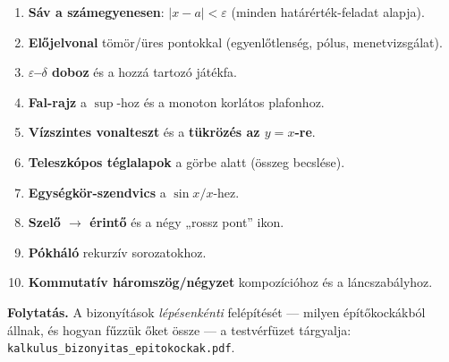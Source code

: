 \documentclass[11pt,a4paper]{article}
\newcommand{\lean}[1]{\texttt{\small #1}}
\newcommand{\eps}{\varepsilon}
\theoremstyle{definition}
\begin{document}
\begin{enumerate}[nosep,leftmargin=*]
  \item \textbf{Sáv a számegyenesen}: $|x-a|<\eps$ (minden határérték-feladat alapja).
  \item \textbf{Előjelvonal} tömör/üres pontokkal (egyenlőtlenség, pólus, menetvizsgálat).
  \item \textbf{$\eps$--$\delta$ doboz} és a hozzá tartozó játékfa.
  \item \textbf{Fal-rajz} a $\sup$-hoz és a monoton korlátos plafonhoz.
  \item \textbf{Vízszintes vonalteszt} és a \textbf{tükrözés az $y=x$-re}.
  \item \textbf{Teleszkópos téglalapok} a görbe alatt (összeg becslése).
  \item \textbf{Egységkör-szendvics} a $\sin x/x$-hez.
  \item \textbf{Szelő $\to$ érintő} és a négy „rossz pont” ikon.
  \item \textbf{Pókháló} rekurzív sorozatokhoz.
  \item \textbf{Kommutatív háromszög/négyzet} kompozícióhoz és a láncszabályhoz.
\end{enumerate}

\bigskip
\noindent\textbf{Folytatás.} A bizonyítások \emph{lépésenkénti} felépítését --- milyen
építőkockákból állnak, és hogyan fűzzük őket össze --- a testvérfüzet tárgyalja:
\lean{kalkulus\_bizonyitas\_epitokockak.pdf}.
\end{document}
